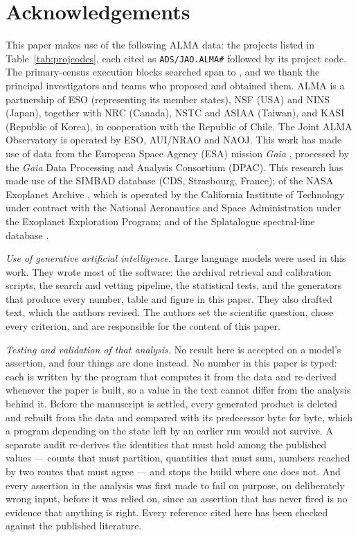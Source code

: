 \section*{Acknowledgements}
This paper makes use of the following ALMA data: the \NProjCodes{} projects
listed in Table~\ref{tab:projcodes}, each cited as \texttt{ADS/JAO.ALMA\#}
followed by its project code. The \NEB{} primary-census execution blocks
searched span \PrEbDateFirst{} to \PrEbDateLast{}, and we thank the principal
investigators and teams who proposed and obtained
them.\ProjCodeUnresClause{} ALMA is a partnership of ESO
(representing its member states), NSF (USA) and NINS (Japan), together with NRC
(Canada), NSTC and ASIAA (Taiwan), and KASI (Republic of Korea), in cooperation
with the Republic of Chile. The Joint ALMA Observatory is operated by ESO,
AUI/NRAO and NAOJ. This work has made use of data from the European Space
Agency (ESA) mission {\it Gaia} \citep{GaiaDR3}, processed by the {\it Gaia}
Data Processing and Analysis Consortium (DPAC). This research has made use
of the SIMBAD database \citep{SIMBAD2000} (CDS, Strasbourg, France); of the
NASA Exoplanet Archive \citep{NEA2013}, which is operated by the California
Institute of Technology under contract with the National Aeronautics and
Space Administration under the Exoplanet Exploration Program; and of the
Splatalogue spectral-line database \citep{Splatalogue2007}.

\emph{Use of generative artificial intelligence.} Large language models were
used in this work. They wrote most of the software: the archival retrieval and
calibration scripts, the search and vetting pipeline, the statistical tests,
and the generators that produce every number, table and figure in this paper.
They also drafted text, which the authors revised. The authors set the
scientific question, chose every criterion, and are responsible for the
content of this paper.

\emph{Testing and validation of that analysis.} No result here is accepted on
a model's assertion, and four things are done instead. No number in this paper
is typed: each is written by the program that computes it from the data and
re-derived whenever the paper is built, so a value in the text cannot differ
from the analysis behind it. Before the manuscript is settled, every generated
product is deleted and rebuilt from the data and compared with its predecessor
byte for byte, which a program depending on the state left by an earlier run
would not survive. A separate audit re-derives the identities that must hold
among the published values --- counts that must partition, quantities that
must sum, numbers reached by two routes that must agree --- and stops the
build where one does not. And every assertion in the analysis was first made
to fail on purpose, on deliberately wrong input, before it was relied on,
since an assertion that has never fired is no evidence that anything is right.
Every reference cited here has been checked against the published literature.

